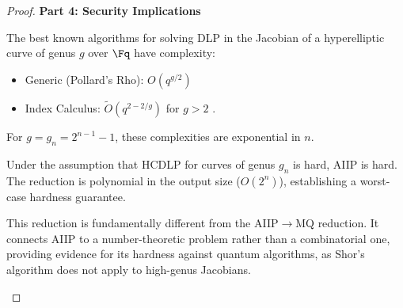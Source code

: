 \begin{proof}
            \textbf{Part 4: Security Implications}
                \begin{lemma}\label{lemma:hcdlp-hard}
                    The best known algorithms for solving DLP in the Jacobian of a hyperelliptic curve of genus \(g\) over \(\Fq\) have complexity:
                    \begin{itemize}
                        \item Generic (Pollard's Rho): \(O(q^{g/2})\)
                        \item Index Calculus: \(\tilde{O}(q^{2 - 2/g})\) for \(g > 2\) \cite{Enge2009}.
                    \end{itemize}
                    For \(g = g_n = 2^{n-1} - 1\), these complexities are exponential in \(n\).
                \end{lemma}
                Under the assumption that HCDLP for curves of genus \(g_n\) is hard, AIIP is hard. The reduction is polynomial in the output size (\(O(2^n)\)), establishing a worst-case hardness guarantee.
                \begin{remark}
                This reduction is fundamentally different from the AIIP\(\to\)MQ reduction. It connects AIIP to a number-theoretic problem rather than a combinatorial one, providing evidence for its hardness against quantum algorithms, as Shor's algorithm does not apply to high-genus Jacobians.
            \end{remark}
        \end{proof}
